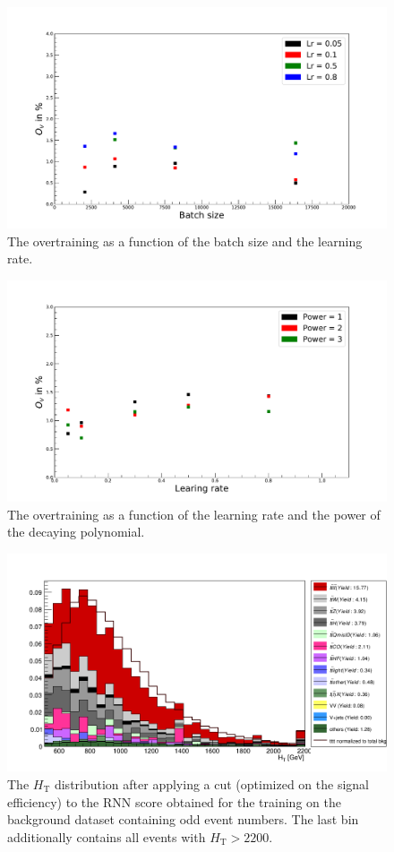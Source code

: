 \begin{figure}[H]
\centering
\includegraphics[width=\linewidth]{figs/RNN/BatchOV}
\caption{The overtraining as a function of the batch size and the learning rate.}
\label{fig:Batch1}
\end{figure}

\begin{figure}[H]
\centering
\includegraphics[width=\linewidth]{figs/RNN/LrOv_Fixed}
\caption{The overtraining as a function of the learning rate and the power of the decaying polynomial.}
\label{fig:Batch2}
\end{figure}

\begin{figure}[H]
\centering
\includegraphics[width=\linewidth]{figs/RNN/HT_all_Odd}
\caption{The $H_{\text{T}}$ distribution after applying a cut (optimized on the signal efficiency) to the RNN score obtained for the training on the background dataset containing odd event numbers. The last bin additionally contains all events with $H_{\text{T}} > 2200$.}
\label{fig:RNNOdd}
\end{figure}
